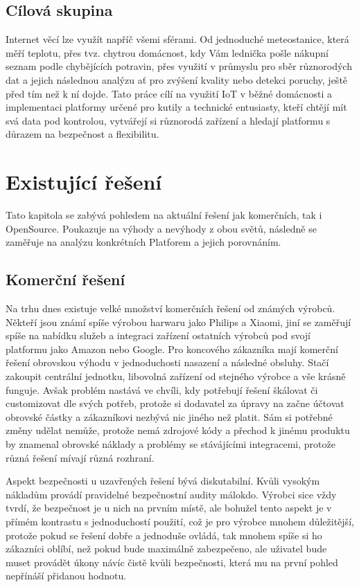 \subsection{Cílová skupina}
Internet věcí lze využít napříč všemi sférami. Od jednoduché meteostanice, která měří teplotu, přes tvz. chytrou domácnost, kdy Vám lednička pošle nákupní seznam podle chybějících potravin, přes využití v průmyslu pro sběr různorodých dat a jejich následnou analýzu ať pro zvýšení kvality nebo detekci poruchy, ještě před tím než k ní dojde. Tato práce cílí na využití IoT v běžné domácnosti a implementaci platformy určené pro kutily a technické entusiasty, kteří chtějí mít svá data pod kontrolou, vytvářejí si různorodá zařízení a hledají platformu s důrazem na bezpečnost a flexibilitu.


\section{Existující řešení}
Tato kapitola se zabývá pohledem na aktuální řešení jak komerčních, tak i OpenSource. Poukazuje na výhody a nevýhody z obou světů, následně se zaměřuje na analýzu konkrétních Platforem a jejich porovnáním.

\subsection{Komerční řešení} %
Na trhu dnes existuje velké množství komerčních řešení od známých výrobců. Někteří jsou známí spíše výrobou harwaru jako Philips a Xiaomi, jiní se zaměřují spíše na nabídku služeb a integraci zařízení ostatních výrobců pod svojí platformu jako Amazon nebo Google. Pro koncového zákazníka mají komerční řešení obrovskou výhodu v jednoduchosti nasazení a následné obsluhy. Stačí zakoupit centrální jednotku, libovolná zařízení od stejného výrobce a vše krásně funguje. Avšak problém nastává ve chvíli, kdy potřebují řešení škálovat či customizovat dle svých potřeb, protože si dodavatel za úpravy na  začne účtovat obrovské částky a zákazníkovi nezbývá nic jiného než platit. Sám si potřebné změny udělat nemůže, protože nemá zdrojové kódy a přechod k jinému produktu by znamenal obrovské náklady a problémy se stávájícími integracemi, protože různá řešení mívají různá rozhraní.

Aspekt bezpečnosti u uzavřených řešení bývá diskutabilní. Kvůli vysokým nákladům provádí pravidelné bezpečnostní audity málokdo. Výrobci sice vždy tvrdí, že bezpečnost je u nich na prvním místě, ale bohužel tento aspekt je v přímém kontrastu s jednoduchostí použití, což je pro výrobce mnohem důležitější, protože pokud se řešení dobře a jednoduše ovládá, tak mnohem spíše si ho zákazníci oblíbí, než pokud bude maximálně zabezpečeno, ale uživatel bude muset provádět úkony návíc čistě kvůli bezpečnosti, která mu na první pohled nepřínáší přidanou hodnotu.

